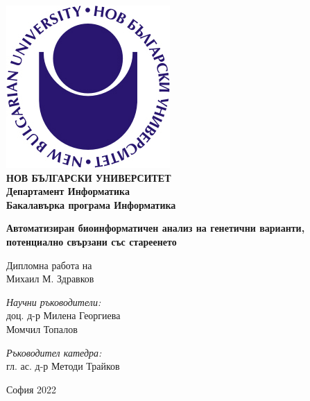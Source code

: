 \documentclass[pdftex,cyrillic,14pt,a4page,book]{extreport}
\begin{document}
\begin{titlepage}
	\begin{center}
	\includegraphics[scale=1.2]{./NBU_logo.jpg}\\[0.3cm]
    \textbf{\Large НОВ БЪЛГАРСКИ УНИВЕРСИТЕТ\\[0.4cm]}
    \textbf{\Large Департамент Информатика\\[0.4cm]}
    \textbf{\Large Бакалавърка програма Информатика\\[3cm]}
   
		\textbf{\LARGE Автоматизиран биоинформатичен анализ на генетични варианти, потенциално свързани със стареенето\\[2cm]}
		\begin{Large}
		Дипломна работа на\\[0.2cm]
		Михаил М. Здравков\\[3cm]
		\end{Large}
		\begin{minipage}{0.48\textwidth}
			\begin{flushleft} \large
				\emph{Научни ръководители:} \\
				доц. д-р Милена Георгиева \\
				Момчил Топалов
			\end{flushleft}
		\end{minipage}
			\begin{minipage}{0.48\textwidth}
			\begin{flushright} \large
				\emph{Ръководител катедра:} \\
				гл. ас. д-р Методи Трайков\\
				\clearpage
			\end{flushright}
		\end{minipage}

		\vfill

		{\large София 2022}

	\end{center}
\end{titlepage}
\end{document}
